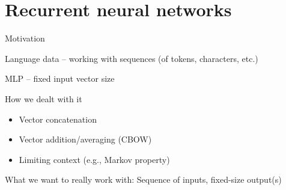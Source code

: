 \documentclass[12pt,aspectratio=169,handout]{beamer}
\begin{document}
\section{Recurrent neural networks}

	
\begin{frame}{Motivation}

Language data -- working with sequences (of tokens, characters, etc.)

MLP -- fixed input vector size

\bigskip

\pause

How we dealt with it

\begin{itemize}
	\item Vector concatenation
	\item Vector addition/averaging (CBOW)
	\item Limiting context (e.g., Markov property)
\end{itemize}

What we want to really work with: Sequence of inputs, fixed-size output(s)

\end{frame}
\end{document}
